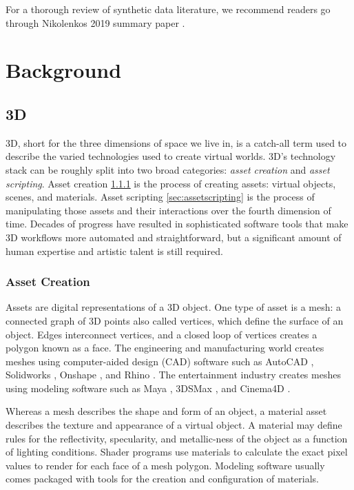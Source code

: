 \documentclass{article}
\begin{document}
For a thorough review of synthetic data literature, we recommend readers go through Nikolenkos 2019 summary paper \cite{nikolenko2019synthetic}.

\section{Background}
\label{sec:background}

\subsection{3D}
\label{sec:3d}

3D, short for the three dimensions of space we live in, is a catch-all term used to describe the varied technologies used to create virtual worlds. 3D’s technology stack can be roughly split into two broad categories: \emph{asset creation} and \emph{asset scripting}. Asset creation \ref{sec:assetcreation} is the process of creating assets: virtual objects, scenes, and materials. Asset scripting \ref{sec:assetscripting} is the process of manipulating those assets and their interactions over the fourth dimension of time. Decades of progress have resulted in sophisticated software tools that make 3D workflows more automated and straightforward, but a significant amount of human expertise and artistic talent is still required.

\subsubsection{Asset Creation}
\label{sec:assetcreation}

Assets are digital representations of a 3D object. One type of asset is a mesh: a connected graph of 3D points also called vertices, which define the surface of an object. Edges interconnect vertices, and a closed loop of vertices creates a polygon known as a face. The engineering and manufacturing world creates meshes using computer-aided design (CAD) software such as AutoCAD \cite{autocad}, Solidworks \cite{solidworks}, Onshape \cite{onshape}, and Rhino \cite{rhino}. The entertainment industry creates meshes using modeling software such as Maya \cite{maya}, 3DSMax \cite{3dsmax}, and Cinema4D \cite{cinema4d}.

Whereas a mesh describes the shape and form of an object, a material asset describes the texture and appearance of a virtual object. A material may define rules for the reflectivity, specularity, and metallic-ness of the object as a function of lighting conditions. Shader programs use materials to calculate the exact pixel values to render for each face of a mesh polygon. Modeling software usually comes packaged with tools for the creation and configuration of materials.
\end{document}
